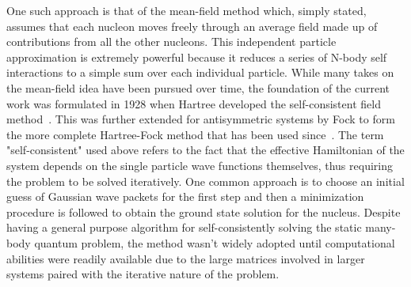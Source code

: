 One such approach is that of the mean-field method which, simply stated, assumes that each nucleon moves freely through an average field made up of contributions from all the other nucleons.
This independent particle approximation is extremely powerful because it reduces a series of N-body self interactions to a simple sum over each individual particle.
While many takes on the mean-field idea have been pursued over time, the foundation of the current work was formulated in 1928 when Hartree developed the self-consistent field method~\citep{hartree1928}.
This was further extended for antisymmetric systems by Fock to form the more complete Hartree-Fock method that has been used since~\citep{fock1930}.
The term "self-consistent" used above refers to the fact that the effective Hamiltonian of the system depends on the single particle wave functions themselves, thus requiring the problem to be solved iteratively.
One common approach is to choose an initial guess of Gaussian wave packets for the first step and then a minimization procedure is followed to obtain the ground state solution for the nucleus.
Despite having a general purpose algorithm for self-consistently solving the static many-body quantum problem, the method wasn't widely adopted until computational abilities were readily available due to the large matrices involved in larger systems paired with the iterative nature of the problem.


